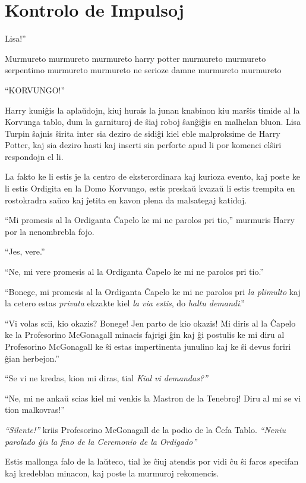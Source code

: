 \chapter{Kontrolo de Impulsoj}

 Lisa!”

\hplettrineextrapara
Murmureto murmureto murmureto harry potter murmureto murmureto
serpentimo murmureto murmureto ne serioze damne murmureto murmureto

``KORVUNGO!''

Harry kuniĝis la aplaŭdojn, kiuj hurais la junan knabinon kiu marŝis
timide al la Korvunga tablo, dum la garnituroj de ŝiaj roboj ŝanĝiĝis
en malhelan bluon. Lisa Turpin ŝajnis ŝirita inter sia deziro de
sidiĝi kiel eble malproksime de Harry Potter, kaj sia deziro hasti kaj
inserti sin perforte apud li por komenci elŝiri respondojn el li.

La fakto ke li estis je la centro de eksterordinara kaj kurioza
evento, kaj poste ke li estis Ordigita en la Domo Korvungo, estis
preskaŭ kvazaŭ li estis trempita en rostokradra saŭco kaj ĵetita en
kavon plena da malsategaj katidoj.

``Mi promesis al la Ordiganta Ĉapelo ke mi ne parolos pri tio,''
murmuris Harry por la nenombrebla fojo.

``Jes, vere.''

``Ne, mi vere promesis al la Ordiganta Ĉapelo ke mi ne parolos pri tio.''

``Bonege, mi promesis al la Ordiganta Ĉapelo ke mi ne parolos pri
\emph{la plimulto} kaj la cetero estas \emph{privata} ekzakte kiel
\emph{la via estis}, do \emph{haltu demandi}.''


``Vi volas scii, kio okazis? Bonege! Jen parto de kio okazis! Mi diris
al la Ĉapelo ke la Profesorino McGonagall minacis fajrigi ĝin kaj ĝi
postulis ke mi diru al Profesorino McGonagall ke ŝi estas
impertinenta junulino kaj ke ŝi devus foriri ĝian herbejon.''

``Se vi ne kredas, kion mi diras, tial \emph{Kial vi demandas?''}

``Ne, mi ne ankaŭ scias kiel mi venkis la Mastron de la Tenebroj! Diru
al mi se vi tion malkovras!''

\emph{``Silente!''} kriis Profesorino McGonagall de la podio de la
Ĉefa Tablo. \emph{``Neniu parolado ĝis la fino de la Ceremonio de la
Ordigado''}

Estis mallonga falo de la laŭteco, tial ke ĉiuj atendis por vidi ĉu ŝi
faros specifan kaj kredeblan minacon, kaj poste la murmuroj
rekomencis.

